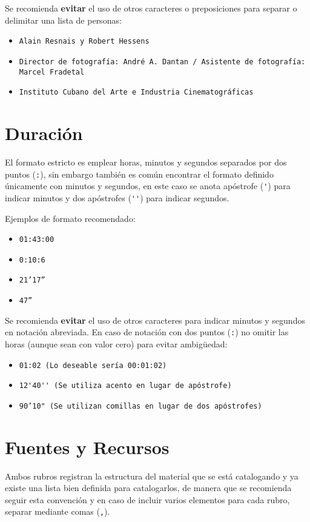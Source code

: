 \documentclass[10pt,letterpaper]{article}
\begin{document}
Se recomienda \textbf{evitar} el uso de otros caracteres o preposiciones para separar o delimitar una lista de personas:

{\color{Red}
\begin{itemize}
	\item \texttt{Alain Resnais y Robert Hessens}
	\item \texttt{Director de fotografía: André A. Dantan / Asistente de fotografía: Marcel Fradetal}
	\item \texttt{Instituto Cubano del Arte e Industria Cinematográficas}
\end{itemize}
}

\section{Duración}
El formato estricto es emplear horas, minutos y segundos separados por dos puntos (\verb|:|), sin embargo también es común encontrar el formato definido únicamente con minutos y segundos, en este caso se anota apóstrofe (\verb|'|) para indicar minutos y dos apóstrofes (\verb|''|) para indicar segundos.

Ejemplos de formato recomendado:
{\color{Blue}
\begin{itemize}
	\item \texttt{01:43:00}
	\item \texttt{0:10:6}
	\item \texttt{21'17''}
	\item \texttt{47''}
\end{itemize}
}

Se recomienda \textbf{evitar} el uso de otros caracteres para indicar minutos y segundos en notación abreviada. En caso de notación con dos puntos (\verb|:|) no omitir las horas (aunque sean con valor cero) para evitar ambigüedad:
{\color{Red}
\begin{itemize}
	\item \texttt{01:02 (Lo deseable sería 00:01:02)}
	\item \texttt{12\'{}40\'{}\'{} (Se utiliza acento en lugar de apóstrofe)}
	\item \texttt{90'10" (Se utilizan comillas en lugar de dos apóstrofes)}
\end{itemize}
}

\section{Fuentes y Recursos}
Ambos rubros registran la estructura del material que se está catalogando y ya existe una lista bien definida para catalogarlos, de manera que se recomienda seguir esta convención y en caso de incluir varios elementos para cada rubro, separar mediante comas (\verb|,|).
\end{document}
